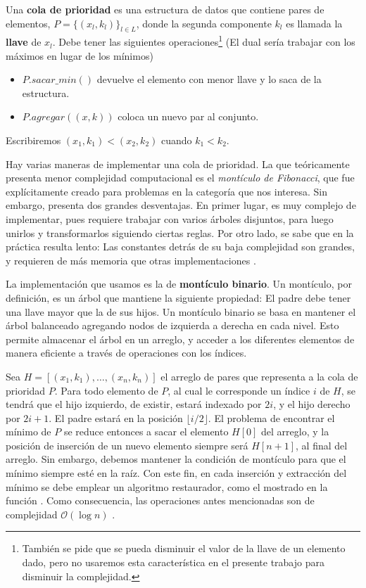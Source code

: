 \documentclass[journal]{IEEEtran}
\begin{document}
Una \textbf{cola de prioridad} es una estructura de datos que contiene pares de elementos, \(P = \{(x_l, k_l)\}_{l \in L}\), donde la segunda componente \(k_l\) es llamada la \textbf{llave} de \(x_l\). Debe tener las siguientes operaciones\footnote{También se pide que se pueda disminuir el valor de la llave de un elemento dado, pero no usaremos esta característica en el presente trabajo para disminuir la complejidad.} (El dual sería trabajar con los máximos en lugar de los mínimos) \cite{clrs}

\begin{itemize}
	\item \(P.sacar\_min()\) devuelve el elemento con menor llave y lo saca de la estructura.
	\item \(P.agregar((x, k))\) coloca un nuevo par al conjunto.
\end{itemize}

Escribiremos \((x_1, k_1) < (x_2, k_2)\) cuando \(k_1 < k_2\).

Hay varias maneras de implementar una cola de prioridad. La que teóricamente presenta menor complejidad computacional es el \textit{montículo de Fibonacci}, que fue explícitamente creado para problemas en la categoría que nos interesa. Sin embargo, presenta dos grandes desventajas. En primer lugar, es muy complejo de implementar, pues requiere trabajar con varios árboles disjuntos, para luego unirlos y transformarlos siguiendo ciertas reglas. Por otro lado, se sabe que en la práctica resulta lento: Las constantes detrás de su baja complejidad son grandes, y requieren de más memoria que otras implementaciones \cite{heap}.

La implementación que usamos es la de \textbf{montículo binario}. Un montículo, por definición, es un árbol que mantiene la siguiente propiedad: El padre debe tener una llave mayor que la de sus hijos. Un montículo binario se basa en mantener el árbol balanceado agregando nodos de izquierda a derecha en cada nivel. Esto permite almacenar el árbol en un arreglo, y acceder a los diferentes elementos de manera eficiente a través de operaciones con los índices.

Sea \(H = [(x_1, k_1),\ldots,(x_n, k_n)]\) el arreglo de pares que representa a la cola de prioridad \(P\). Para todo elemento de \(P\), al cual le corresponde un índice \(i\) de \(H\), se tendrá que el hijo izquierdo, de existir, estará indexado por \(2i\), y el hijo derecho por \(2i + 1\). El padre estará en la posición \( \lfloor i/2 \rfloor \). El problema de encontrar el mínimo de \(P\) se reduce entonces a sacar el elemento \(H[0]\) del arreglo, y la posición de inserción de un nuevo elemento siempre será \(H[n+1]\), al final del arreglo. Sin embargo, debemos mantener la condición de montículo para que el mínimo siempre esté en la raíz. Con este fin, en cada inserción y extracción del mínimo se debe emplear un algoritmo restaurador, como el mostrado en la función . Como consecuencia, las operaciones antes mencionadas son de complejidad \( \mathcal{O}(\log n) \) \cite{clrs}.
\end{document}
